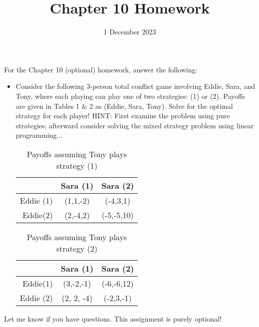 \documentclass{article}
\title{Chapter 10 Homework}
\date{1 December 2023}
\begin{document}
\maketitle

For the Chapter 10 (optional) homework, answer the following:

\begin{itemize}

\item Consider the following 3-person total conflict game involving Eddie, Sara, and Tony, where each playing can play one of two strategies: (1) or (2). Payoffs are given in Tables 1 \& 2 as (Eddie, Sara, Tony). Solve for the optimal strategy for each player! HINT: First examine the problem using pure strategies; afterward consider solving the mixed strategy problem using linear programming...

\begin{table}[h]
\centering
\caption{Payoffs assuming Tony plays strategy (1)}
\begin{tabular}{r|c|c}
& Sara (1) & Sara (2) \\
 \hline
Eddie (1) & (1,1,-2) & (-4,3,1)  \\
Eddie(2) & (2,-4,2) & (-5,-5,10)  \\
\hline
\end{tabular}
\end{table}

\begin{table}[h]
\centering
\caption{Payoffs assuming Tony plays strategy (2)}
\begin{tabular}{r|c|c}
& Sara (1) & Sara (2) \\
 \hline
Eddie(1) & (3,-2,-1) & (-6,-6,12)  \\
Eddie (2) & (2, 2, -4) & (-2,3,-1)  \\
\hline
\end{tabular}
\end{table}

\end{itemize}


Let me know if you have questions. This assignment is purely optional!
\end{document}
